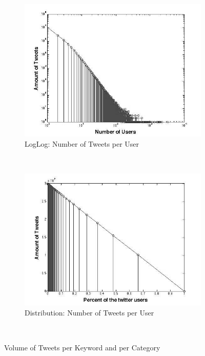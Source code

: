 \begin{figure}
        \centering
        \begin{subfigure}[b]{0.5\textwidth}
                \includegraphics[width=\textwidth]{img/anal/loglog_users_tweets_1}
                \caption{LogLog: Number of Tweets per User}
                 \label{fig:u_log}
        \end{subfigure}%
        ~ %
        \begin{subfigure}[b]{0.5\textwidth}
                \includegraphics[width=\textwidth]{img/anal/no_power_1}
                \caption{Distribution: Number of Tweets per User}
                \label{fig:no_power}
        \end{subfigure}
        ~ %
      
        \caption{Volume of Tweets per Keyword and per Category}\label{fig:animals}
\end{figure}





